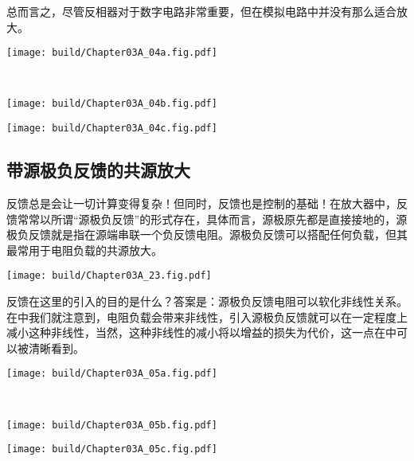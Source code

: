 总而言之，尽管反相器对于数字电路非常重要，但在模拟电路中并没有那么适合放大。

\begin{Figure}[采用反相器构型的共源级增益]
    \begin{FigureSub}
        \texttt{[image: build/Chapter03A\_04a.fig.pdf]}
    \end{FigureSub}\\ \vspace{0.5cm}
    \begin{FigureSub}
        \texttt{[image: build/Chapter03A\_04b.fig.pdf]}
    \end{FigureSub}
    \begin{FigureSub}
        \texttt{[image: build/Chapter03A\_04c.fig.pdf]}
    \end{FigureSub}
\end{Figure}

\subsection{带源极负反馈的共源放大}
反馈总是会让一切计算变得复杂！但同时，反馈也是控制的基础！在放大器中，反馈常常以所谓“源极负反馈”的形式存在，具体而言，源极原先都是直接接地的，源极负反馈就是指在源端串联一个负反馈电阻。源极负反馈可以搭配任何负载，但其最常用于电阻负载的共源放大。

\begin{Figure}[带源极负反馈的共源级电路]
    \texttt{[image: build/Chapter03A\_23.fig.pdf]}
\end{Figure}

反馈在这里的引入的目的是什么？答案是：源极负反馈电阻可以软化非线性关系。在中我们就注意到，电阻负载会带来非线性，引入源极负反馈就可以在一定程度上减小这种非线性，当然，这种非线性的减小将以增益的损失为代价，这一点在中可以被清晰看到。
\begin{Figure}[带源极负反馈的共源极增益]
    \begin{FigureSub}
        \texttt{[image: build/Chapter03A\_05a.fig.pdf]}
    \end{FigureSub}\\ \vspace{0.5cm}
    \begin{FigureSub}
        \texttt{[image: build/Chapter03A\_05b.fig.pdf]}
    \end{FigureSub}
    \begin{FigureSub}
        \texttt{[image: build/Chapter03A\_05c.fig.pdf]}
    \end{FigureSub}
\end{Figure}

